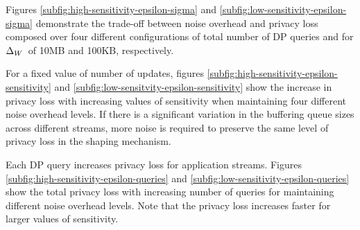 Figures \ref{subfig:high-sensitivity-epsilon-sigma} and
\ref{subfig:low-sensitivity-epsilon-sigma} demonstrate the trade-off between
noise overhead and privacy loss composed over four different configurations of
total number of DP queries and for $\Delta_{W}$~of 10MB and 100KB, respectively.

For a fixed value of number of updates, figures
\ref{subfig:high-sensitivity-epsilon-sensitivity} and
\ref{subfig:low-sensitvity-epsilon-sensitivity} show the increase in privacy
loss with increasing values of sensitivity when maintaining four different noise
overhead levels.
If there is a significant variation in the buffering queue sizes across
different streams, more noise is required to preserve the same level of privacy
loss in the shaping mechanism.

Each DP query increases privacy loss for application streams. Figures
\ref{subfig:high-sensitivity-epsilon-queries} and
\ref{subfig:low-sensitivity-epsilon-queries} show the total privacy loss with
increasing number of queries for maintaining different noise overhead
levels.
Note that the privacy loss increases faster for larger values of sensitivity.
\fi

